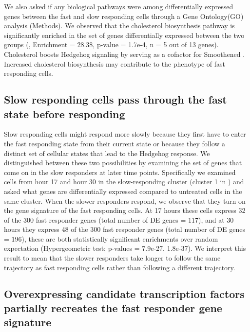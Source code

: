 We also asked if any biological pathways were among differentially expressed genes between the fast and slow responding cells through a Gene Ontology(GO) analysis (Methods). We observed that the cholesterol biosynthesis pathway is significantly enriched in the set of genes differentially expressed between the two groups (, Enrichment = 28.38, p-value = 1.7e-4, n = 5 out of 13 genes). Cholesterol boosts Hedgehog signaling by serving as a cofactor for Smoothened \cite{Huang2018-iz,Huang2016-er,Kinnebrew2019-gt,Luchetti2016-cd,Radhakrishnan2020-ii}. Increased cholesterol biosynthesis may contribute to the phenotype of fast responding cells. 


\subsection{Slow responding cells pass through the fast state before responding}

Slow responding cells might respond more slowly because they first have to enter the fast responding state from their current state or because they follow a distinct set of cellular states that lead to the Hedgehog response. We distinguished between these two possibilities by examining the set of genes that come on in the slow responders at later time points. Specifically we examined cells from hour 17 and hour 30 in the slow-responding cluster (cluster 1 in ) and asked what genes are differentially expressed compared to untreated cells in the same cluster. When the slower responders respond, we observe that they turn on the gene signature of the fast responding cells. At 17 hours these cells express 32 of the 300 fast responder genes (total number of DE genes = 117), and at 30 hours they express 48 of the 300 fast responder genes (total number of DE genes = 196), these are both statistically significant enrichments over random expectation (Hypergeometric test; p-values = 7.9e-27, 1.8e-37). We interpret this result to mean that the slower responders take longer to follow the same trajectory as fast responding cells rather than following a different trajectory.

\subsection{Overexpressing candidate transcription factors partially recreates the fast responder gene signature}

